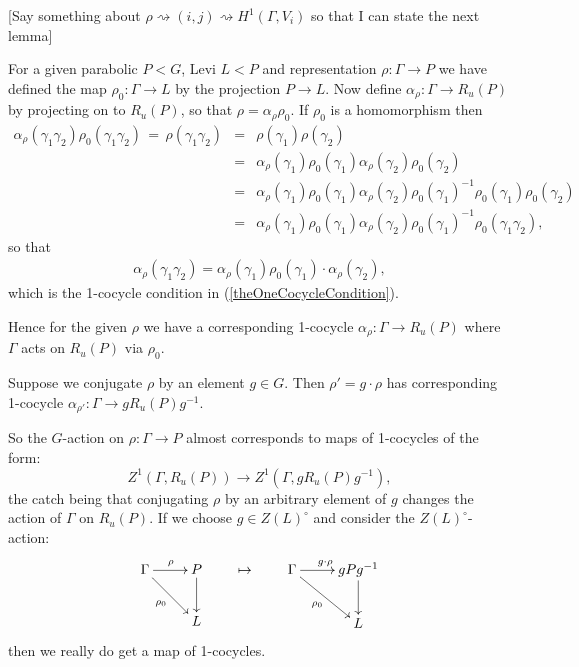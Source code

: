 [Say something about $\rho \rightsquigarrow (i,j) \rightsquigarrow H^1(\Gamma,V_i)$ so that I can state the next lemma]

For a given parabolic $P<G$, Levi $L<P$ and representation $\rho:\Gamma\rightarrow P$ we have defined the map $\rho_0:\Gamma\rightarrow L$ by the projection $P\rightarrow L$. Now define $\alpha_\rho:\Gamma\rightarrow R_u(P)$ by projecting on to $R_u(P)$, so that $\rho = \alpha_\rho\rho_0$. If $\rho_0$ is a homomorphism then
\begin{eqnarray*}
	\alpha_\rho(\gamma_1\gamma_2)\rho_0(\gamma_1\gamma_2) \,=\, \rho(\gamma_1\gamma_2) 
		&=& \rho(\gamma_1)\rho(\gamma_2) \\
		&=& \alpha_\rho(\gamma_1)\rho_0(\gamma_1)\alpha_\rho(\gamma_2)\rho_0(\gamma_2) \\
		&=& \alpha_\rho(\gamma_1)\rho_0(\gamma_1)\alpha_\rho(\gamma_2)\rho_0(\gamma_1)^{-1}\rho_0(\gamma_1)\rho_0(\gamma_2)\\
		&=&\alpha_\rho(\gamma_1)\rho_0(\gamma_1)\alpha_\rho(\gamma_2)\rho_0(\gamma_1)^{-1}\rho_0(\gamma_1\gamma_2),
\end{eqnarray*}
so that
\begin{eqnarray*}
	\alpha_\rho(\gamma_1\gamma_2) =
	\alpha_\rho(\gamma_1)\rho_0(\gamma_1)\cdot\alpha_\rho(\gamma_2),
\end{eqnarray*}
which is the 1-cocycle condition in (\ref{theOneCocycleCondition}).

Hence for the given $\rho$ we have a corresponding 1-cocycle $\alpha_\rho:\Gamma\rightarrow R_u(P)$ where $\Gamma$ acts on $R_u(P)$ via $\rho_0$.

Suppose we conjugate $\rho$ by an element $g\in G$. Then $\rho'=g\cdot\rho$ has corresponding 1-cocycle $\alpha_{\rho'}:\Gamma\rightarrow gR_u(P)g^{-1}$.

So the $G$-action on $\rho:\Gamma\rightarrow P$ almost corresponds to maps of 1-cocycles of the form:
\begin{displaymath}
	Z^1(\Gamma, R_u(P))\rightarrow Z^1(\Gamma, gR_u(P)g^{-1}),
\end{displaymath}
the catch being that conjugating $\rho$ by an arbitrary element of $g$ changes the action of $\Gamma$ on $R_u(P)$. If we choose $g\in Z(L)^\circ$ and consider the $Z(L)^\circ$-action:
\begin{displaymath}
	\xymatrix{
		\Gamma \ar[r]^{\rho} \ar[rd]_{\rho_0} & P \ar[d]\\
		& L} \qquad\mapsto\qquad
	\xymatrix{
		\Gamma \ar[r]^{g\cdot\rho} \ar[rd]_{\rho_0} & gPg^{-1} \ar[d]\\
		& L}
\end{displaymath}
then we really do get a map of 1-cocycles. 



